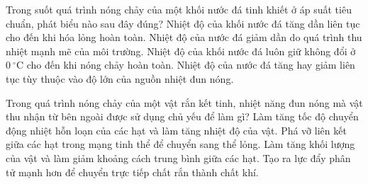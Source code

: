 \begin{ex}
Trong suốt quá trình nóng chảy của một khối nước đá tinh khiết ở áp suất tiêu chuẩn, phát biểu nào sau đây đúng?
\choice
{Nhiệt độ của khối nước đá tăng dần liên tục cho đến khi hóa lỏng hoàn toàn.}
{Nhiệt độ của nước đá giảm dần do quá trình thu nhiệt mạnh mẽ của môi trường.}
{\True Nhiệt độ của khối nước đá luôn giữ không đổi ở $0\ ^\circ\mathrm{C}$ cho đến khi nóng chảy hoàn toàn.}
{Nhiệt độ của nước đá tăng hay giảm liên tục tùy thuộc vào độ lớn của nguồn nhiệt đun nóng.}
\end{ex}

\begin{ex}
Trong quá trình nóng chảy của một vật rắn kết tinh, nhiệt năng đun nóng mà vật thu nhận từ bên ngoài được sử dụng chủ yếu để làm gì?
\choice
{Làm tăng tốc độ chuyển động nhiệt hỗn loạn của các hạt và làm tăng nhiệt độ của vật.}
{\True Phá vỡ liên kết giữa các hạt trong mạng tinh thể để chuyển sang thể lỏng.}
{Làm tăng khối lượng của vật và làm giảm khoảng cách trung bình giữa các hạt.}
{Tạo ra lực đẩy phân tử mạnh hơn để chuyển trực tiếp chất rắn thành chất khí.}
\end{ex}

